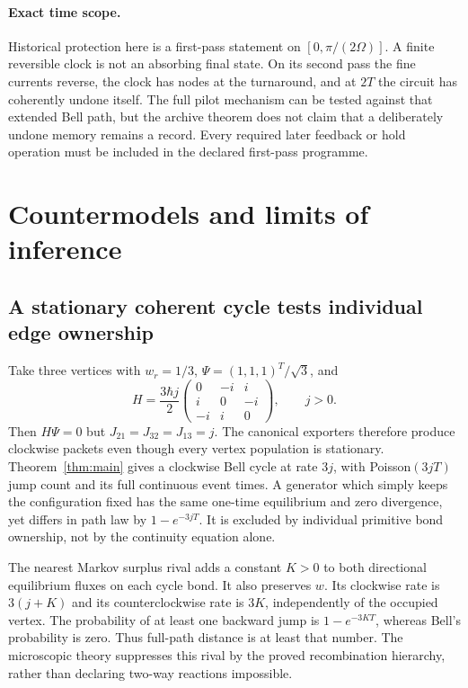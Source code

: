 \documentclass[11pt]{article}
\theoremstyle{definition}\newtheorem{definition}[theorem]{Definition}
\theoremstyle{remark}\newtheorem{remark}[theorem]{Remark}
\begin{document}
\paragraph{Exact time scope.}
Historical protection here is a first-pass statement on
$[0,\pi/(2\Omega)]$.  A finite reversible clock is not an absorbing
final state.  On its second pass the fine currents reverse, the
clock has nodes at the turnaround, and at $2T$ the circuit has
coherently undone itself.  The full pilot mechanism can be tested
against that extended Bell path, but the archive theorem does not
claim that a deliberately undone memory remains a record.  Every
required later feedback or hold operation must be included in the
declared first-pass programme.


\section{Countermodels and limits of inference}\label{sec:rivals}
\subsection{A stationary coherent cycle tests individual edge ownership}
Take three vertices with $w_r=1/3$, $\Psi=(1,1,1)^T/\sqrt3$, and
\[
 H=\frac{3\hbar j}{2}
 \begin{pmatrix}0&-i&i\\i&0&-i\\-i&i&0\end{pmatrix},\qquad j>0.
\]
Then $H\Psi=0$ but $J_{21}=J_{32}=J_{13}=j$. The canonical exporters therefore produce clockwise packets even though every vertex population is stationary. Theorem~\ref{thm:main} gives a clockwise Bell cycle at rate $3j$, with Poisson$(3jT)$ jump count and its full continuous event times. A generator which simply keeps the configuration fixed has the same one-time equilibrium and zero divergence, yet differs in path law by $1-e^{-3jT}$. It is excluded by individual primitive bond ownership, not by the continuity equation alone.

The nearest Markov surplus rival adds a constant $K>0$ to both directional equilibrium fluxes on each cycle bond. It also preserves $w$. Its clockwise rate is $3(j+K)$ and its counterclockwise rate is $3K$, independently of the occupied vertex. The probability of at least one backward jump is $1-e^{-3KT}$, whereas Bell's probability is zero. Thus full-path distance is at least that number. The microscopic theory suppresses this rival by the proved recombination hierarchy, rather than declaring two-way reactions impossible.
\end{document}
